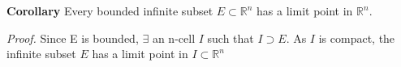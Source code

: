 \documentclass[12pt]{article}
\begin{document}
\vspace{1.5\baselineskip}
\begin{block}{\bf Corollary} Every bounded infinite subset $E\subset \mathbb{R}^n$ has a limit point in $\mathbb{R}^n$.
\end{block}

\vspace{1.5\baselineskip}
\begin{block}{\sl Proof.} Since E is bounded, $\exists$ an n-cell $I$ such that $I\supset E$. As $I$ is compact, the infinite subset $E$ has a limit point in $I\subset \mathbb{R}^n$\end{block}
\end{document}
